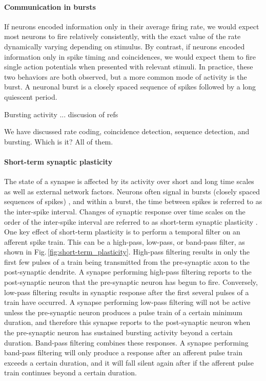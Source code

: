 \documentclass[twocolumn]{article}
\begin{document}
\paragraph{Communication in bursts}
If neurons encoded information only in their average firing rate, we would expect most neurons to fire relatively consistently, with the exact value of the rate dynamically varying depending on stimulus. By contrast, if neurons encoded information only in spike timing and coincidences, we would expect them to fire single action potentials when presented with relevant stimuli. In practice, these two behaviors are both observed, but a more common mode of activity is the burst. A neuronal burst is a closely spaced sequence of spikes followed by a long quiescent period. 

Bursting activity ... discusion of refs \cite{li1997,izde2003}

\vspace{3em}
We have discussed rate coding, coincidence detection, sequence detection, and bursting. Which is it? All of them. \cite{majo2005}

\paragraph{Short-term synaptic plasticity}
The state of a synapse is affected by its activity over short and long time scales as well as external network factors. Neurons often signal in bursts (closely spaced sequences of spikes) \cite{iz2007}, and within a burst, the time between spikes is referred to as the inter-spike interval. Changes of synaptic response over time scales on the order of the inter-spike interval are referred to as short-term synaptic plasticity \cite{abre2004}. One key effect of short-term plasticity is to perform a temporal filter on an afferent spike train. This can be a high-pass, low-pass, or band-pass filter, as shown in Fig.\,\ref{fig:short-term_plasticity}. High-pass filtering results in only the first few pulses of a train being transmitted from the pre-synaptic axon to the post-synaptic dendrite. A synapse performing high-pass filtering reports to the post-synaptic neuron that the pre-synaptic neuron has begun to fire. Conversely, low-pass filtering results in synaptic response after the first several pulses of a train have occurred. A synapse performing low-pass filtering will not be active unless the pre-synaptic neuron produces a pulse train of a certain minimum duration, and therefore this synapse reports to the post-synaptic neuron when the pre-synaptic neuron has sustained bursting activity beyond a certain duration. Band-pass filtering combines these responses. A synapse performing band-pass filtering will only produce a response after an afferent pulse train exceeds a certain duration, and it will fall silent again after if the afferent pulse train continues beyond a certain duration.
\end{document}
